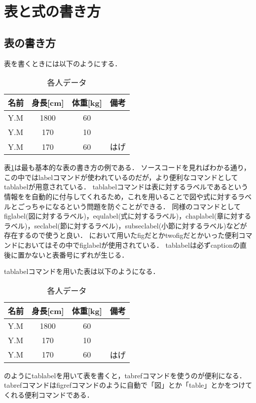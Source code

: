 \section{表と式の書き方}

\subsection{表の書き方}
表を書くときには以下のようにする．
\begin{table}[tb]
  \begin{center}
    \caption{各人データ}
    \label{sample}
    \begin{tabular}{l|c|c|r}
      \hline
      名前 & 身長[cm] & 体重[kg] & 備考 \\
      \hline
      Y.M & 1800 & 60 & \\
      Y.M & 170 & 10 & \\
      Y.M & 170 & 60 & はげ\\
      \hline
    \end{tabular}
  \end{center}
\end{table}
表\ref{sample}は最も基本的な表の書き方の例である．
ソースコードを見ればわかる通り，この中ではlabelコマンドが使われているのだが，より便利なコマンドとしてtablabelが用意されている．
tablabelコマンドは表に対するラベルであるという情報をを自動的に付与してくれるため，これを用いることで図や式に対するラベルとごっちゃになるという問題を防ぐことができる．
同様のコマンドとしてfiglabel(図に対するラベル)，equlabel(式に対するラベル)，chaplabel(章に対するラベル)，seclabel(節に対するラベル)，subseclabel(小節に対するラベル)などが存在するので使うと良い．
において用いたfigだとかtwofigだとかいった便利コマンドにおいてはその中でfiglabelが使用されている．
tablabelは必ずcaptionの直後に置かないと表番号にずれが生じる．

tablabelコマンドを用いた表は以下のようになる．
\begin{table}[tb]
  \begin{center}
    \caption{各人データ}
    \begin{tabular}{l|c|c|r}
      \hline
      名前 & 身長[cm] & 体重[kg] & 備考 \\
      \hline
      Y.M & 1800 & 60 & \\
      Y.M & 170 & 10 & \\
      Y.M & 170 & 60 & はげ\\
      \hline
    \end{tabular}
  \end{center}
\end{table}
のようにtablabelを用いて表を書くと，tabrefコマンドを使うのが便利になる．
tabrefコマンドはfigrefコマンドのように自動で「図」とか「table」とかをつけてくれる便利コマンドである．

